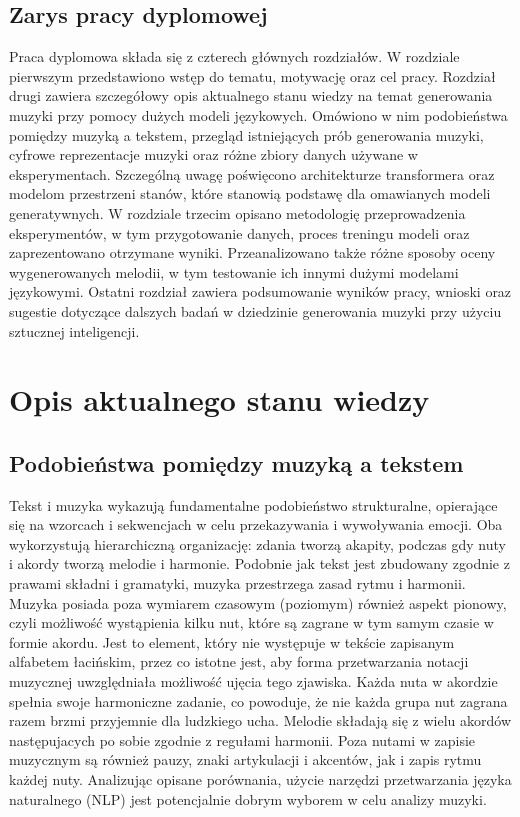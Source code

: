 \documentclass[data-science]{agh-wi} %
\begin{document}
\section{Zarys pracy dyplomowej}
Praca dyplomowa składa się z czterech głównych rozdziałów. W rozdziale pierwszym przedstawiono wstęp do tematu, motywację oraz cel pracy. Rozdział drugi zawiera szczegółowy opis aktualnego stanu wiedzy na temat generowania muzyki przy pomocy dużych modeli językowych. Omówiono w nim podobieństwa pomiędzy muzyką a tekstem, przegląd istniejących prób generowania muzyki, cyfrowe reprezentacje muzyki oraz różne zbiory danych używane w eksperymentach. Szczególną uwagę poświęcono architekturze transformera oraz modelom przestrzeni stanów, które stanowią podstawę dla omawianych modeli generatywnych. W rozdziale trzecim opisano metodologię przeprowadzenia eksperymentów, w tym przygotowanie danych, proces treningu modeli oraz zaprezentowano otrzymane wyniki. Przeanalizowano także różne sposoby oceny wygenerowanych melodii, w tym testowanie ich innymi dużymi modelami językowymi. Ostatni rozdział zawiera podsumowanie wyników pracy, wnioski oraz sugestie dotyczące dalszych badań w dziedzinie generowania muzyki przy użyciu sztucznej inteligencji.

\chapter{Opis aktualnego stanu wiedzy}
\section{Podobieństwa pomiędzy muzyką a tekstem}
Tekst i muzyka wykazują fundamentalne podobieństwo strukturalne, opierające się na wzorcach i sekwencjach w celu przekazywania i wywoływania emocji. Oba wykorzystują hierarchiczną organizację: zdania tworzą akapity, podczas gdy nuty i akordy tworzą melodie i harmonie. Podobnie jak tekst jest zbudowany zgodnie z prawami składni i gramatyki, muzyka przestrzega zasad rytmu i harmonii. Muzyka posiada poza wymiarem czasowym (poziomym) również aspekt pionowy, czyli możliwość wystąpienia kilku nut, które są zagrane w tym samym czasie w formie akordu. Jest to element, który nie występuje w tekście zapisanym alfabetem łacińskim, przez co istotne jest, aby forma przetwarzania notacji muzycznej uwzględniała możliwość ujęcia tego zjawiska. Każda nuta w akordzie spełnia swoje harmoniczne zadanie, co powoduje, że nie każda grupa nut zagrana razem brzmi przyjemnie dla ludzkiego ucha. Melodie składają się z wielu akordów następujacych po sobie zgodnie z regułami harmonii. Poza nutami w zapisie muzycznym są również pauzy, znaki artykulacji i akcentów, jak i zapis rytmu każdej nuty. Analizując opisane porównania, użycie narzędzi przetwarzania języka naturalnego (NLP) jest potencjalnie dobrym wyborem w celu analizy muzyki.
\end{document}
